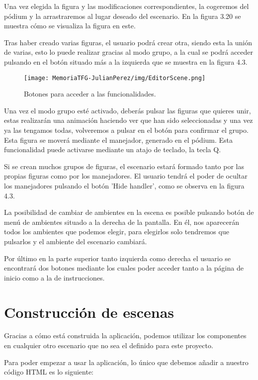 \documentclass[a4paper, 12pt]{book}
\begin{document}
Una vez elegida la figura y las modificaciones correspondientes, la cogeremos del pódium y la arrastraremos al lugar deseado del escenario. En la figura 3.20 se muestra cómo se visualiza la figura en este.

Tras haber creado varias figuras, el usuario podrá crear otra, siendo esta la unión de varias, esto lo puede realizar gracias al modo grupo, a la cual se podrá acceder pulsando en el botón situado más a la izquierda que se muestra en la figura 4.3.
\begin{figure}[H]
  \centering
  \texttt{[image: MemoriaTFG-JulianPerez/img/EditorScene.png]}
  \caption{Botones para acceder a las funcionalidades.}\label{home}
\end{figure}

Una vez el modo grupo esté activado, deberás pulsar las figuras que quieres unir, estas realizarán una animación haciendo ver que han sido seleccionadas y una vez ya las tengamos todas, volveremos a pulsar en el botón para confirmar el grupo. Esta figura se moverá mediante el manejador, generado en el pódium. Esta funcionalidad puede activarse mediante un atajo de teclado, la tecla Q.

Si se crean muchos grupos de figuras, el escenario estará formado tanto por las propias figuras como por los manejadores. El usuario tendrá el poder de ocultar los manejadores pulsando el botón 'Hide handler', como se observa en la figura 4.3.

La posibilidad de cambiar de ambientes en la escena es posible pulsando botón de menú de ambientes situado a la derecha de la pantalla. En él, nos aparecerán todos los ambientes que podemos elegir, para elegirlos solo tendremos que pulsarlos y el ambiente del escenario cambiará.

Por último en la parte superior tanto izquierda como derecha el usuario se encontrará dos botones mediante los cuales poder acceder tanto a la página de inicio como a la de instrucciones.

\section{Construcción de escenas}
\label{sec:Construcción de escenas}
Gracias a cómo está construida la aplicación, podemos utilizar los componentes en cualquier otro escenario que no sea el definido para este proyecto.

Para poder empezar a usar la aplicación, lo único que debemos añadir a nuestro código HTML es lo siguiente:
\end{document}
